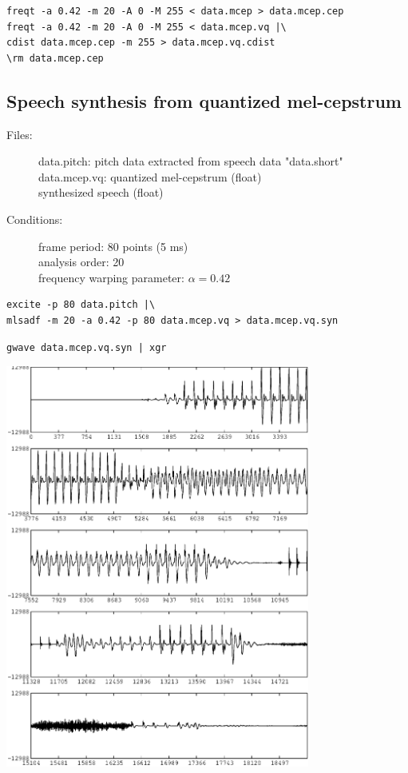 \documentclass[a4paper,10pt]{article}
\begin{document}
\begin{verbatim}
freqt -a 0.42 -m 20 -A 0 -M 255 < data.mcep > data.mcep.cep
freqt -a 0.42 -m 20 -A 0 -M 255 < data.mcep.vq |\
cdist data.mcep.cep -m 255 > data.mcep.vq.cdist
\rm data.mcep.cep
\end{verbatim}

\subsection{Speech synthesis from quantized mel-cepstrum}

\begin{description}
\item[Files:]
  data.pitch: pitch data extracted from speech data "data.short"\\
  data.mcep.vq: quantized mel-cepstrum (float) \\
  synthesized speech (float)
\item[Conditions:]
  frame period: 80 points (5 ms)\\
  analysis order: 20 \\
  frequency warping parameter: $\alpha = 0.42$
\end{description}

\begin{verbatim}
excite -p 80 data.pitch |\
mlsadf -m 20 -a 0.42 -p 80 data.mcep.vq > data.mcep.vq.syn
\end{verbatim}

\begin{verbatim}
gwave data.mcep.vq.syn | xgr
\end{verbatim}

\includegraphics[width=10cm]{data.mcep.vq.syn.gwave.eps}
\end{document}
